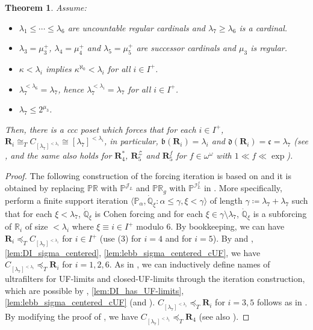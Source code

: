 \documentclass[a4paper,12pt]{amsart}
\newtheorem{thm}{Theorem}
\theoremstyle{definition}
\numberwithin{thm}{section}
\numberwithin{equation}{section}
\renewcommand{\a}{\alpha}
\newcommand{\p}{\mathbb{P}}
\newcommand{\q}{\mathbb{Q}}
\newcommand{\br}{\mathbb{R}}
\newcommand{\qd}{\dot{\mathbb{Q}}}
\newcommand{\oo}{{\omega}^\omega}
\newcommand{\bb}{\mathfrak{b}}
\newcommand{\cc}{\mathfrak{c}}
\newcommand{\dd}{\mathfrak{d}}
\newcommand{\R}{\mathbf{R}}
\renewcommand{\lq}{\preceq_T}
\newcommand{\ind}{i}
\newcommand{\I}{\mathscr{I}}
\newcommand{\J}{\mathscr{J}}
\newcommand{\dif}{\mathbb{P}^{\I_L^f}}
\newcommand{\Z}{\mathcal{Z}}
\newcommand{\posetJL}{\mathbb{P}^{\J_L}}
\begin{document}
    \begin{thm}\label{thm:CM_left}
        Assume:
		\begin{itemize}
			\item $\lambda_1\leq\cdots\leq\lambda_6$ are uncountable regular cardinals and $\lambda_7\geq\lambda_6$ is a cardinal.
			\item $\lambda_3=\mu_3^+$, $\lambda_4=\mu_4^+$ and $\lambda_5=\mu_5^+$ are successor cardinals and $\mu_3$ is regular.
            \item \label{item_aleph1_inacc}$\kappa<\lambda_\ind$ implies $\kappa^{\aleph_0}<\lambda_\ind$ for all $\ind\in I^+$.
			\item \label{item_ca_3}
			$\lambda_7^{<\lambda_6}=\lambda_7$, hence $\lambda_7^{<\lambda_\ind}=\lambda_7$ for all $\ind\in I^+$.
			\item $\lambda_7\leq2^{\mu_3}$.
		\end{itemize}
        Then, there is a ccc poset which forces that for each $\ind\in I^+$, $\R_\ind\cong_T C_{[\lambda_7]^{<\lambda_\ind}}\cong [\lambda_7]^{<\lambda_\ind}$, in particular, $\bb(\R_\ind)=\lambda_\ind$ and $\dd(\R_\ind)=\cc=\lambda_7$ (see , and the same also holds for $\R_4^*$, $\R_5^{\Z}$ and $\R_5^f$ for $f\in\oo$ with $1\ll f\ll\exp$).
    \end{thm}
    \begin{proof}
        The following construction of the forcing iteration is based on \cite{Yam24} and it is obtained by replacing $\mathbb{PR}$ with $\posetJL$ and $\mathbb{PR}_g$ with $\dif$ in \cite[Construction 5.6]{Yam24}. More specifically, perform a finite support iteration $\langle\p_\a,\dot{\q}_\xi:\a\leq\gamma, \xi<\gamma \rangle$ of length $\gamma\coloneqq\lambda_7+\lambda_7$ such that for each $\xi<\lambda_7$, $\qd_\xi$ is Cohen forcing and for each $\xi\in\gamma\setminus\lambda_7$, $\qd_\xi$ is a subforcing of $\br_i$ of size $<\lambda_i$ where $\xi\equiv i\in I^+$ modulo $6$. By bookkeeping, we can have $\R_\ind\lq C_{[\lambda_7]^{<\lambda_\ind}}$ for $\ind\in I^+$ (use  (3) for $\ind=4$ and  for $\ind=5$). By  and , \ref{lem:DI_sigma_centered}, \ref{lem:lebb_sigma_centered_cUF}, we have $C_{[\lambda_7]^{<\lambda_\ind}}\lq\R_\ind$ for $\ind=1,2,6$. As in \cite[Construction 5.6]{Yam24}, we can inductively define names of ultrafilters for UF-limits and closed-UF-limits through the iteration construction, which are possible by , \ref{lem:DI_has_UF-limits}, \ref{lem:lebb_sigma_centered_cUF} (and ). $C_{[\lambda_7]^{<\lambda_\ind}}\lq\R_\ind$ for $\ind=3,5$ follows as in \cite[Construction 5.6]{Yam24}. By modifying the proof of ,  we have $C_{[\lambda_7]^{<\lambda_\ind}}\lq\R_4$ (see also \cite[Main Lemma 3.26]{Yam25}).
    \end{proof}
\end{document}
